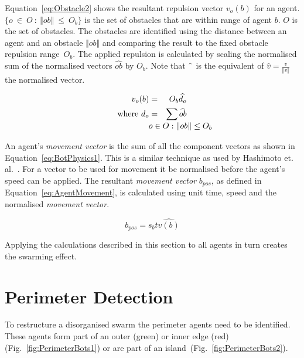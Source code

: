 \documentclass{ieeeaccess}
\newcommand{\magn}[1]{\Vert{#1}\Vert}
\begin{document}
Equation~\ref{eq:Obstacle2} shows the resultant repulsion vector $v_o(b)$ for an agent. $\{o~\in~O~:~\magn{ob}~\leq~O_b\}$ is the set of obstacles that are within range of agent $b$. $O$ is the set of obstacles. The obstacles are identified using the distance between an agent and an obstacle $\magn{ob}$ and comparing the result to the fixed obstacle repulsion range~$O_b$. The applied repulsion is calculated by scaling the normalised sum of the normalised vectors $\widehat{ob}$ by $O_b$. Note that $\string^$ is the equivalent of $\hat{v} = \frac{v}{\magn{v}}$ the normalised vector.


\begin{eqnarray}\label{eq:Obstacle2}
  v_o(b) & = & O_b \widehat{d_o} \\
  \mathrm{where~}  d_o & = & \sum_{\lefteqn{o\in O : \|ob\| \leq O_b}} \widehat{ob}
  \nonumber
\end{eqnarray}

An agent's \textit{movement vector} is the sum of all the component vectors as shown in Equation~\ref{eq:BotPhysics1}. This is a similar technique as used by Hashimoto et. al.~\cite{HAY:08}. For a vector to be used for movement it be normalised before the agent's speed can be applied. The resultant \textit{movement vector} $b_{pos}$, as defined in Equation~\ref{eq:AgentMovement}, is calculated using unit time, speed and the normalised \textit{movement vector}.

\begin{equation}\label{eq:AgentMovement}
  b_{pos}=s_{b}t\widehat{v(b)} 
\end{equation}

Applying the calculations described in this section to all agents in turn creates the swarming effect. 
  
\section{Perimeter Detection}\label{sec:PerimeterDetection}
To restructure a disorganised swarm the perimeter agents need to be identified. These agents form part of an outer ({\color{green}green}) or inner edge ({\color{red}red}) (Fig.~\ref{fig:PerimeterBots1}) or are part of an island~(Fig.~\ref{fig:PerimeterBots2}).
\end{document}
